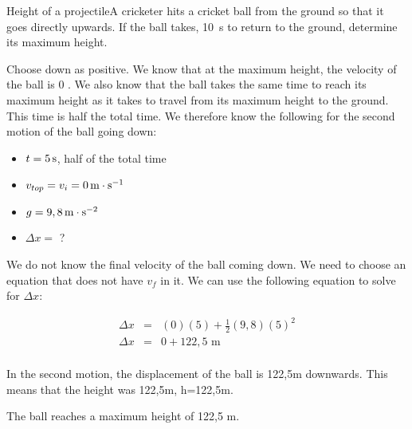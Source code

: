 \begin{wex}{Height of a projectile}{A cricketer hits a cricket ball from the ground so that it goes directly upwards. If the ball takes, 10~s to return to the ground, determine its maximum height.}
{Choose down as positive. We know that at the maximum height, the velocity of the ball is 0 \ms. We also know that the ball takes the same time to reach its maximum height as it takes to travel from its maximum height to the ground. This time is half the total time. We therefore know the following for the second motion of the ball going down:
\begin{itemize}
\item{$t=5\,\mathrm{s}$, half of the total time}
\item{$v_{top}=v_i=0\,\mathrm{m \cdot s^{-1}}$}
\item{$g=9,8\,\mathrm{m \cdot s^{-2}}$}
\item{$\Delta x=$ ?}
\end{itemize}

We do not know the final velocity of the ball coming down. We need to choose an equation that does not have $v_f$ in it. We can use the following equation to solve for $\Delta x$:

\begin{eqnarray*}
\Delta x &=& (0)(5) + \frac{1}{2}(9,8)(5)^2\\
\Delta x &=& 0 + 122,5\text{ m}\\
\end{eqnarray*}

In the second motion, the displacement of the ball is 122,5m downwards. This means that the height was 122,5m, h=122,5m.

The ball reaches a maximum height of 122,5 m.}
\end{wex}

\newpage

